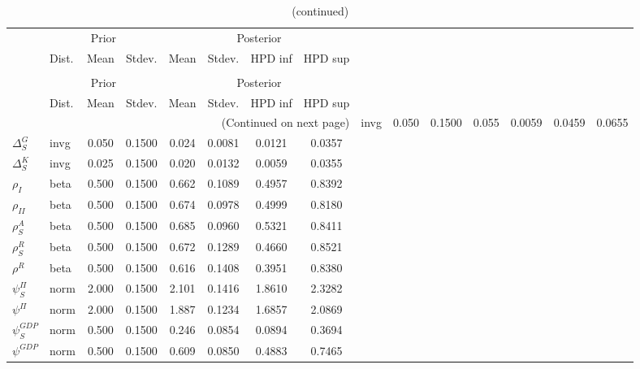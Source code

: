  
\begin{center}
\begin{longtable}{llcccccc} 
\caption{Results from Metropolis-Hastings (parameters)}
 \label{Table:MHPosterior:1}\\
\toprule 
  & \multicolumn{3}{c}{Prior}  &  \multicolumn{4}{c}{Posterior} \\
  \cmidrule(r{.75em}){2-4} \cmidrule(r{.75em}){5-8}
  & Dist. & Mean  & Stdev. & Mean & Stdev. & HPD inf & HPD sup\\
\midrule \endfirsthead 
\caption{(continued)}\\\toprule 
  & \multicolumn{3}{c}{Prior}  &  \multicolumn{4}{c}{Posterior} \\
  \cmidrule(r{.75em}){2-4} \cmidrule(r{.75em}){5-8}
  & Dist. & Mean  & Stdev. & Mean & Stdev. & HPD inf & HPD sup\\
\midrule \endhead 
\bottomrule \multicolumn{8}{r}{(Continued on next page)} \endfoot 
\bottomrule \endlastfoot 
${\Delta^{A}_{S}}$ & invg &   0.050 & 0.1500 &   0.055& 0.0059 &  0.0459 &  0.0655 \\ 
${\Delta^{G}_{S}}$ & invg &   0.050 & 0.1500 &   0.024& 0.0081 &  0.0121 &  0.0357 \\ 
${\Delta^{K}_{S}}$ & invg &   0.025 & 0.1500 &   0.020& 0.0132 &  0.0059 &  0.0355 \\ 
${\rho_{I}}$ & beta &   0.500 & 0.1500 &   0.662& 0.1089 &  0.4957 &  0.8392 \\ 
${\rho_{II}}$ & beta &   0.500 & 0.1500 &   0.674& 0.0978 &  0.4999 &  0.8180 \\ 
${\rho^{A}_{S}}$ & beta &   0.500 & 0.1500 &   0.685& 0.0960 &  0.5321 &  0.8411 \\ 
${\rho^{R}_{S}}$ & beta &   0.500 & 0.1500 &   0.672& 0.1289 &  0.4660 &  0.8521 \\ 
${\rho^{R}}$ & beta &   0.500 & 0.1500 &   0.616& 0.1408 &  0.3951 &  0.8380 \\ 
${\psi^{\Pi}_{S}}$ & norm &   2.000 & 0.1500 &   2.101& 0.1416 &  1.8610 &  2.3282 \\ 
${\psi^{\Pi}}$ & norm &   2.000 & 0.1500 &   1.887& 0.1234 &  1.6857 &  2.0869 \\ 
${\psi^{GDP}_{S}}$ & norm &   0.500 & 0.1500 &   0.246& 0.0854 &  0.0894 &  0.3694 \\ 
${\psi^{GDP}}$ & norm &   0.500 & 0.1500 &   0.609& 0.0850 &  0.4883 &  0.7465 \\ 
\end{longtable}
 \end{center}
